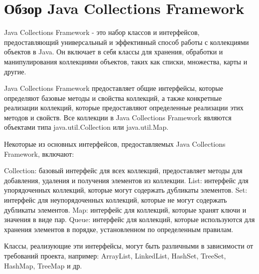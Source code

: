 \section{Обзор Java Collections Framework}
Java Collections Framework - это набор классов и интерфейсов, предоставляющий универсальный и эффективный способ работы с коллекциями объектов в Java. Он включает в себя классы для хранения, обработки и манипулирования коллекциями объектов, таких как списки, множества, карты и другие.

Java Collections Framework предоставляет общие интерфейсы, которые определяют базовые методы и свойства коллекций, а также конкретные реализации коллекций, которые предоставляют определенные реализации этих методов и свойств. Все коллекции в Java Collections Framework являются объектами типа java.util.Collection или java.util.Map.

Некоторые из основных интерфейсов, предоставляемых Java \newline Collections Framework, включают:

    Collection: базовый интерфейс для всех коллекций, предоставляет методы для добавления, удаления и получения элементов из коллекции.
    List: интерфейс для упорядоченных коллекций, которые могут содержать дубликаты элементов.
    Set: интерфейс для неупорядоченных коллекций, которые не могут содержать дубликаты элементов.
    Map: интерфейс для коллекций, которые хранят ключи и значения в виде пар.
    Queue: интерфейс для коллекций, которые используются для хранения элементов в порядке, установленном по определенным правилам.

Классы, реализующие эти интерфейсы, могут быть различными в зависимости от требований проекта, например: ArrayList, LinkedList, HashSet, TreeSet, HashMap, TreeMap и др.

